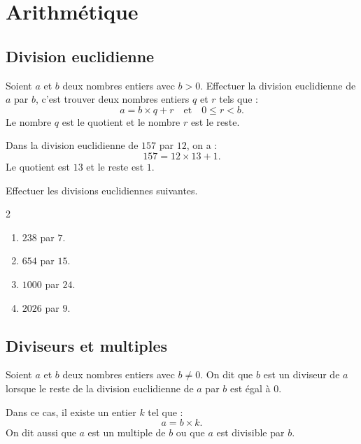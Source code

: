 \documentclass[a4paper,10pt]{report}
\begin{document}
\newpage
\setcounter{chapter}{0}
\chapter{Arithmétique}

\section{Division euclidienne}

\begin{defn}
Soient $a$ et $b$ deux nombres entiers avec $b>0$.
Effectuer la division euclidienne de $a$ par $b$, c'est trouver deux nombres entiers $q$ et $r$ tels que :
\[
a=b\times q+r \quad \text{et} \quad 0\leq r < b.
\]
Le nombre $q$ est le quotient et le nombre $r$ est le reste.
\end{defn}

\begin{ex}
Dans la division euclidienne de $157$ par $12$, on a :
\[
157=12\times 13+1.
\]
Le quotient est $13$ et le reste est $1$.
\end{ex}

\begin{ex}
Effectuer les divisions euclidiennes suivantes.

\begin{multicols}{2}
\begin{enumerate}
\item $238$ par $7$.
\item $654$ par $15$.
\item $1000$ par $24$.
\item $2026$ par $9$.
\end{enumerate}
\end{multicols}

\noindent\grandscarreaux{\linewidth}{4cm}
\end{ex}

\section{Diviseurs et multiples}

\begin{defn}
Soient $a$ et $b$ deux nombres entiers avec $b\neq 0$.
On dit que $b$ est un diviseur de $a$ lorsque le reste de la division euclidienne de $a$ par $b$ est égal à $0$.

Dans ce cas, il existe un entier $k$ tel que :
\[
a=b\times k.
\]
On dit aussi que $a$ est un multiple de $b$ ou que $a$ est divisible par $b$.
\end{defn}
\end{document}
